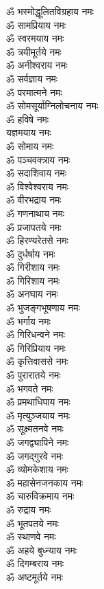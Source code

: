 \begin{multicols}{2}
\begin{flushleft}
ॐ भस्मोद्धूलितविग्रहाय नमः\\
ॐ सामप्रियाय नमः\\
ॐ स्वरमयाय नमः\\
ॐ त्रयीमूर्तये नमः\\
ॐ अनीश्वराय नमः\\
ॐ सर्वज्ञाय नमः\\
ॐ परमात्मने नमः\\
ॐ सोमसूर्याग्निलोचनाय नमः\\
ॐ हविषे  नमः\\
यज्ञमयाय नमः\hfill{}\\
ॐ सोमाय नमः\\
ॐ पञ्चवक्त्राय नमः\\
ॐ सदाशिवाय नमः\\
ॐ विश्वेश्वराय नमः\\
ॐ वीरभद्राय नमः\\
ॐ गणनाथाय नमः\\
ॐ प्रजापतये नमः\\
ॐ हिरण्यरेतसे नमः\\
ॐ दुर्धर्षाय नमः\\
ॐ गिरीशाय नमः\hfill{}\\
ॐ गिरिशाय नमः\\
ॐ अनघाय नमः\\
ॐ भुजङ्गभूषणाय नमः\\
ॐ भर्गाय नमः\\
ॐ गिरिधन्वने नमः\\
ॐ गिरिप्रियाय नमः\\
ॐ कृत्तिवाससे नमः\\
ॐ पुरारातये नमः\\
ॐ भगवते नमः\\
ॐ प्रमथाधिपाय नमः\hfill{}\\
ॐ मृत्युञ्जयाय नमः\\
ॐ सूक्ष्मतनवे नमः\\
ॐ जगद्व्यापिने नमः\\
ॐ जगद्गुरवे नमः\\
ॐ व्योमकेशाय नमः\\
ॐ महासेनजनकाय नमः\\
ॐ चारुविक्रमाय नमः\\
ॐ रुद्राय नमः\\
ॐ भूतपतये नमः\\
ॐ स्थाणवे नमः\hfill{}\\
ॐ अहये बुध्न्याय नमः\\
ॐ दिगम्बराय नमः\\
ॐ अष्टमूर्तये नमः\\

\end{flushleft}
\end{multicols}

